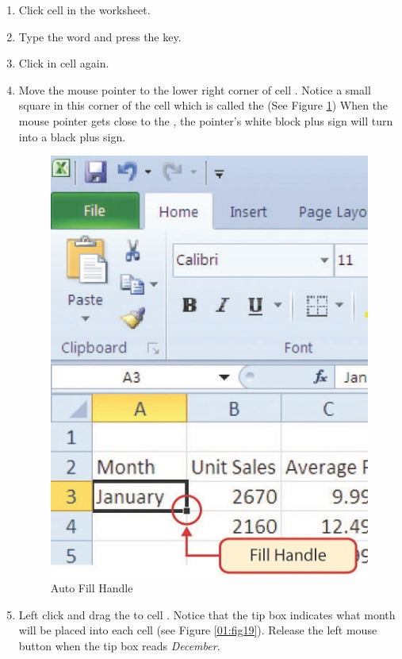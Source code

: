 \begin{enumbox}
	\begin{enumerate}
		\item Click cell  in the  worksheet.
		\item Type the word  and press the  key.
		\item Click in cell  again.
		\item Move the mouse pointer to the lower right corner of cell . Notice a small square in this corner of the cell which is called the  (See Figure \ref{01:fig18}) When the mouse pointer gets close to the , the pointer's white block plus sign will turn into a black plus sign.

		\begin{figure}[H]
			\centering
			\includegraphics[width=\maxwidth{.75\linewidth}]{gfx/ch01_fig18}
			\caption{Auto Fill Handle}
			\label{01:fig18}
		\end{figure}

		\item Left click and drag the  to cell . Notice that the  tip box indicates what month will be placed into each cell (see Figure \ref{01:fig19}). Release the left mouse button when the tip box reads \textit{December}.
	\end{enumerate}
\end{enumbox}
	
